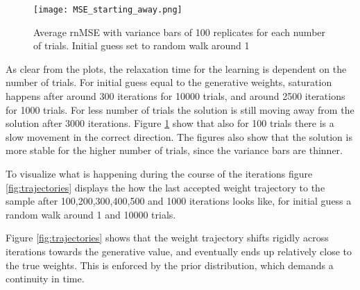 \begin{figure}[hbt!]
\caption{Average rnMSE with variance bars of 100 replicates for each number of trials. Initial guess set to random walk around 1}
\label{fig:MSE2}
    \centering
    \texttt{[image: MSE\_starting\_away.png]}
\end{figure}

As clear from the plots, the relaxation time for the learning is dependent on the number of trials. For initial guess equal to the generative weights, saturation happens after around 300 iterations for 10000 trials, and around 2500 iterations for 1000 trials. For less number of trials the solution is still moving away from the solution after 3000 iterations. Figure \ref{fig:MSE2} show that also for 100 trials there is a slow movement in the correct direction. The figures also show that the solution is more stable for the higher number of trials, since the variance bars are thinner.  

To visualize what is happening during the course of the iterations figure \ref{fig:trajectories} displays the how the last accepted weight trajectory to the sample after 100,200,300,400,500 and 1000 iterations looks like, for initial guess a random walk around 1 and 10000 trials. 

Figure \ref{fig:trajectories} shows that the weight trajectory shifts rigidly across iterations towards the generative value, and eventually ends up relatively close to the true weights. This is enforced by the prior distribution, which demands a continuity in time. 

